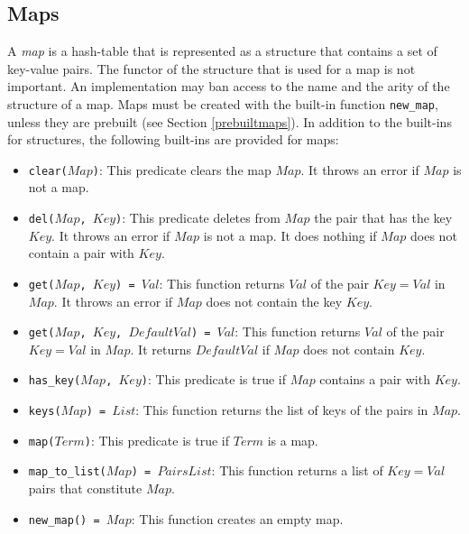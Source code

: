 \subsection{Maps}
A \emph{map} is a hash-table that is represented as a structure that contains a set of key-value pairs. The functor of the structure that is used for a map is not important.  An implementation may ban access to the name and the arity of the structure of a map. Maps must be created with the built-in function \texttt{new\_map}, unless they are prebuilt (see Section \ref{prebuiltmaps}). In addition to the built-ins for structures, the following built-ins are provided for maps:
\begin{itemize}
\item \texttt{clear($Map$)}: This predicate clears the map $Map$. It throws an error if $Map$ is not a map.
\item \texttt{del($Map$, $Key$)}: This predicate deletes from $Map$ the pair that has the key $Key$. It throws an error if $Map$ is not a map. It does nothing if $Map$ does not contain a pair with $Key$.
\item \texttt{get($Map$, $Key$) = $Val$}: This function returns \texttt{$Val$} of the pair \texttt{$Key$$=$$Val$} in \texttt{$Map$}. It throws an error if $Map$ does not contain the key $Key$.
\item \texttt{get($Map$, $Key$, $DefaultVal$) = $Val$}: This function returns \texttt{$Val$} of the pair \newline \texttt{$Key$$=$$Val$} in \texttt{$Map$}. It returns $DefaultVal$ if $Map$ does not contain $Key$.
\item \texttt{has\_key($Map$, $Key$)}: This predicate is true if $Map$ contains a pair with $Key$. 
\item \texttt{keys($Map$) = $List$}: This function returns the list of keys of the pairs in $Map$.
\item \texttt{map($Term$)}: This predicate is true if $Term$ is a map. 
\item \texttt{map\_to\_list($Map$) = $PairsList$}: This function returns a list of \texttt{$Key$$=$$Val$} pairs that constitute $Map$. 
\item \texttt{new\_map() = $Map$}: This function creates an empty map.

\end{itemize}
